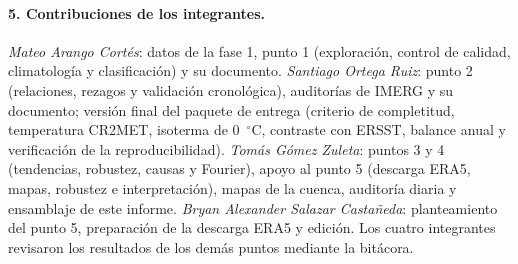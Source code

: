 \documentclass[11pt,a4paper]{article}
\begin{document}
\paragraph{5. Contribuciones de los integrantes.} \emph{Mateo Arango Cortés}: datos de la fase 1, punto 1 (exploración, control de calidad, climatología y clasificación) y su documento. \emph{Santiago Ortega Ruiz}: punto 2 (relaciones, rezagos y validación cronológica), auditorías de IMERG y su documento; versión final del paquete de entrega (criterio de completitud, temperatura CR2MET, isoterma de 0~$^\circ$C, contraste con ERSST, balance anual y verificación de la reproducibilidad). \emph{Tomás Gómez Zuleta}: puntos 3 y 4 (tendencias, robustez, causas y Fourier), apoyo al punto 5 (descarga ERA5, mapas, robustez e interpretación), mapas de la cuenca, auditoría diaria y ensamblaje de este informe. \emph{Bryan Alexander Salazar Castañeda}: planteamiento del punto 5, preparación de la descarga ERA5 y edición. Los cuatro integrantes revisaron los resultados de los demás puntos mediante la bitácora.
\renewcommand{\refname}{Referencias}
\end{document}
